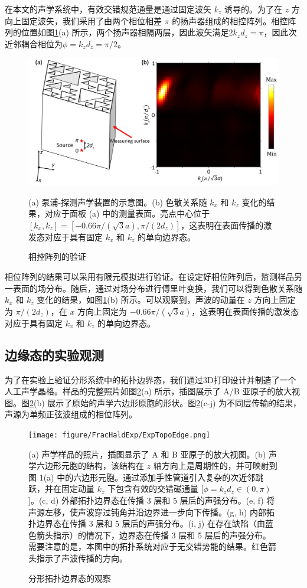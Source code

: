 在本文的声学系统中，有效交错规范通量是通过固定波矢 $k_z$ \quad [$\phi = k_z d_z = \pi/2$] 诱导的。为了在 $z$ 方向上固定波矢，我们采用了由两个相位相差 $\pi$ 的扬声器组成的相控阵列。相控阵列的位置如图\ref{fig:PhaseArray}(a) 所示，两个扬声器相隔两层，因此波矢满足$2k_zd_z=\pi$，因此次近邻耦合相位为$\phi=k_zd_z=\pi/2$。

\begin{figure}[htbp]
    \centering
    \includegraphics[width=0.5\linewidth]{figure/FracHaldExp/PhaseArray.png}
    \caption{相控阵列的验证}(a) 泵浦-探测声学装置的示意图。(b) 色散关系随 $k_x$ 和 $k_z$ 变化的结果，对应于面板 (a) 中的测量表面。亮点中心位于 $[k_x, k_z] = [-0.66\pi/(\sqrt{3} a), \pi/(2d_z)]$，这表明在表面传播的激发态对应于具有固定 $k_x$ 和 $k_z$ 的单向边界态。
    \label{fig:PhaseArray}
\end{figure}

相位阵列的结果可以采用有限元模拟进行验证。在设定好相位阵列后，监测样品另一表面的场分布。随后，通过对场分布进行傅里叶变换，我们可以得到色散关系随 $k_x$ 和 $k_z$ 变化的结果，如图\ref{fig:PhaseArray}(b) 所示。可以观察到，声波的动量在 $z$ 方向上固定为 $\pi/(2d_z)$，在 $x$ 方向上固定为 $-0.66 \pi/(\sqrt{3} a)$，这表明在表面传播的激发态对应于具有固定 $k_x$ 和 $k_z$ 的单向边界态。

\subsection{边缘态的实验观测}
为了在实验上验证分形系统中的拓扑边界态，我们通过3D打印设计并制造了一个人工声学晶格。样品的完整照片如图\ref{fig:ExpTopoEdge}(a) 所示，插图展示了 A/B 亚原子的放大视图。图\ref{fig:ExpTopoEdge}(b) 展示了原始的声学六边形原胞的形状。图\ref{fig:ExpTopoEdge}(c-j) 为不同层传输的结果，声源为单频正弦波组成的相位阵列。

\begin{figure}[htbp]
    \centering
    \texttt{[image: figure/FracHaldExp/ExpTopoEdge.png]}
    \caption{分形拓扑边界态的观察}(a) 声学样品的照片，插图显示了 A 和 B 亚原子的放大视图。(b) 声学六边形元胞的结构，该结构在 $z$ 轴方向上是周期性的，并可映射到图 1(a) 中的六边形元胞。通过添加手性管道引入复杂的次近邻跳跃，并在固定动量 $k_z$ 下包含有效的交错磁通量 [$\phi = k_z d_z \in (0, \pi)$]。(c, d) 外部拓扑边界态在传播 3 层和 5 层后的声强分布。(e, f) 将声源左移，使声波穿过钝角并沿边界进一步向下传播。(g, h) 内部拓扑边界态在传播 3 层和 5 层后的声强分布。(i, j) 在存在缺陷（由蓝色箭头指示）的情况下，边界态在传播 3 层和 5 层后的声强分布。需要注意的是，本图中的拓扑系统对应于无交错势能的结果。红色箭头指示了声波传播的方向。
    \label{fig:ExpTopoEdge}
\end{figure}

